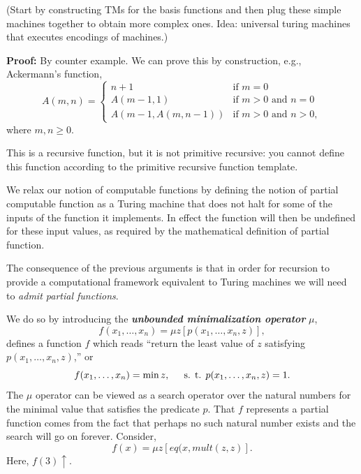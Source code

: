 \documentclass[a4paper,blends,pdf,colorBG,slideColor]{prosper}
\begin{document}
(Start by constructing TMs for the basis functions and then plug these simple machines together
to obtain more complex ones.  Idea: universal turing machines that executes encodings of
machines.)
\es


\small
{}

{\bf Proof:} By counter example. We can prove this by construction, e.g., Ackermann's function,
\[
A(m,n) = \left \{
\begin{array}{ll}
n + 1 & \text{if $m = 0$}\\
A(m-1,1) &\text{if $m>0$ and $n = 0$}\\
A(m-1,A(m,n-1)) &\text{if $m>0$ and $n>0$},
\end{array}
\right .
\]
where $m,n \ge 0$.

This is a recursive function, but it is not primitive recursive: you cannot define this function
according to the primitive recursive function template.
\es



\vspace{.2in}
We relax our notion of computable functions by defining the notion of partial
computable function as a Turing machine that does not halt for some of the inputs
of the function it implements.  In effect the function will then be undefined for 
these input values, as required by the mathematical definition of partial function.
\es

{\small
The consequence of the previous arguments is that in order for recursion to provide
a computational framework equivalent to Turing machines we will need
to {\em admit partial functions}.

We do so by introducing the {\bf\em unbounded minimalization operator} $\mu$,
\[
f(x_1,\ldots,x_n) = \mu z[p(x_1,\ldots,x_n,z)],
\]
defines a function $f$ which reads ``return the least value of $z$ satisfying $p(x_1,\ldots,x_n,z)$,'' or 
\[
f(x_1,\ldots,x_n) = \min z, \hspace{.2in}\mbox{s. t. $p(x_1,\ldots,x_n,z) = 1$}.
\]
The $\mu$ operator can be viewed as a search operator over the natural numbers
for the minimal value that satisfies the predicate $p$.  That $f$ represents a partial 
function comes from the fact that perhaps no such natural number exists and the
search will go on forever. Consider,
\[
f(x) = \mu z[eq(x, mult(z,z)].
\]
Here, $f(3)\uparrow$.
}
\es
\end{document}

